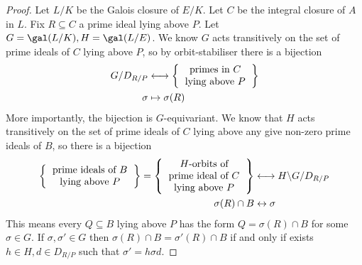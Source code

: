 \documentclass[a4paper]{article}
\begin{document}
\begin{proof}
  Let \(L/K\) be the Galois closure of \(E/K\). Let \(C\) be the integral closure of \(A\) in \(L\). Fix \(R \subseteq C\) a prime ideal lying above \(P\). Let \(G = \gal(L/K), H = \gal(L/E)\). We know \(G\) acts transitively on the set of prime ideals of \(C\) lying above \(P\), so by orbit-stabiliser there is a bijection
  \begin{align*}
    G/D_{R/P} &\longleftrightarrow
                \left\{
                \begin{tabular}{c}
                  primes in \(C\) \\
                  lying above \(P\)
                \end{tabular}
    \right\}
    \\
    \sigma &\mapsto \sigma(R)
  \end{align*}
  More importantly, the bijection is \(G\)-equivariant. We know that \(H\) acts transitively on the set of prime ideals of \(C\) lying above any give non-zero prime ideals of \(B\), so there is a bijection
  \begin{align*}
    \left\{
    \begin{tabular}{c}
      prime ideals of \(B\) \\
      lying above \(P\)
    \end{tabular}
    \right\}
    =
      \left\{
      \begin{tabular}{c}
        \(H\)-orbits of \\
        prime ideal of \(C\) \\
        lying above \(P\)
      \end{tabular}
    \right\}
    &\longleftrightarrow
      H \backslash G /D_{R/P} \\
    \sigma(R) \cap B &\leftrightarrow \sigma
  \end{align*}
  This means every \(Q \subseteq B\) lying above \(P\) has the form \(Q = \sigma(R) \cap B\) for some \(\sigma \in G\). If \(\sigma, \sigma' \in G\) then \(\sigma(R) \cap B = \sigma'(R) \cap B\) if and only if exists \(h \in H, d \in D_{R/P}\) such that \(\sigma' = h\sigma d\).


\end{proof}
\end{document}

